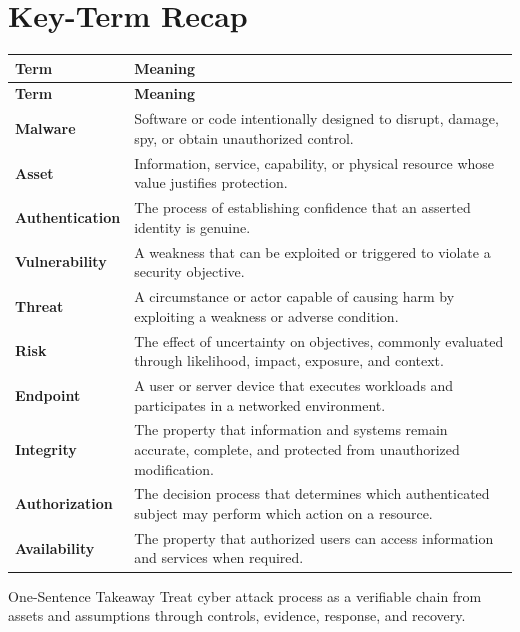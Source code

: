 \documentclass[11pt,letterpaper]{article}
\begin{document}
\section*{Key-Term Recap}
\begin{longtable}{>{\raggedright\arraybackslash}p{}>{\raggedright\arraybackslash}p{}}
\toprule\rowcolor{Navy}\color{white}\textbf{Term} & \color{white}\textbf{Meaning}\\\midrule
\endfirsthead
\toprule\rowcolor{Navy}\color{white}\textbf{Term} & \color{white}\textbf{Meaning}\\\midrule
\endhead
\textbf{Malware} & Software or code intentionally designed to disrupt, damage, spy, or obtain unauthorized control. \\\midrule
\textbf{Asset} & Information, service, capability, or physical resource whose value justifies protection. \\\midrule
\textbf{Authentication} & The process of establishing confidence that an asserted identity is genuine. \\\midrule
\textbf{Vulnerability} & A weakness that can be exploited or triggered to violate a security objective. \\\midrule
\textbf{Threat} & A circumstance or actor capable of causing harm by exploiting a weakness or adverse condition. \\\midrule
\textbf{Risk} & The effect of uncertainty on objectives, commonly evaluated through likelihood, impact, exposure, and context. \\\midrule
\textbf{Endpoint} & A user or server device that executes workloads and participates in a networked environment. \\\midrule
\textbf{Integrity} & The property that information and systems remain accurate, complete, and protected from unauthorized modification. \\\midrule
\textbf{Authorization} & The decision process that determines which authenticated subject may perform which action on a resource. \\\midrule
\textbf{Availability} & The property that authorized users can access information and services when required. \\\midrule
\bottomrule
\end{longtable}
\begin{CornellExamBox}{One-Sentence Takeaway}
Treat cyber attack process as a verifiable chain from assets and assumptions through controls, evidence, response, and recovery.
\end{CornellExamBox}
\end{document}
